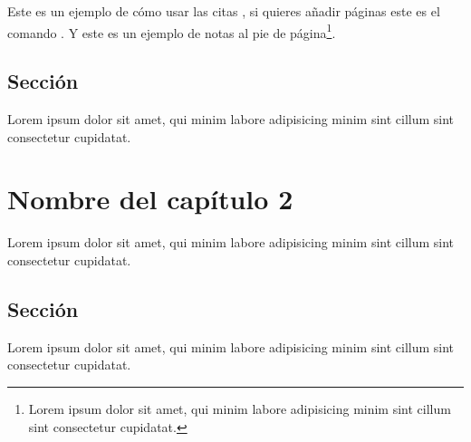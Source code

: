 \documentclass[letterpaper,12pt]{book} %
\begin{document}
Este es un ejemplo de cómo usar las citas
\parencite{Sartlp}, si quieres añadir páginas este
es el comando \parencite[50-60]{parmh}. Y este es
un ejemplo de notas al pie de
página\footnote{Lorem ipsum dolor sit amet, qui
minim labore adipisicing minim sint cillum sint
consectetur cupidatat.}.


\section{Sección}

Lorem ipsum dolor sit amet, qui minim labore adipisicing minim sint cillum sint consectetur cupidatat.


    \clearpage
\thispagestyle{empty}

    \chapter{Nombre del capítulo 2}
\thispagestyle{empty}
\pagestyle{empty}

\cleardoublepage

\pagestyle{headings}

Lorem ipsum dolor sit amet, qui minim labore adipisicing minim sint cillum sint consectetur cupidatat.

\section{Sección}

Lorem ipsum dolor sit amet, qui minim labore adipisicing minim sint cillum sint consectetur cupidatat.


    \clearpage
\thispagestyle{empty}
\cleardoublepage

\pagestyle{headings}


    \cleardoublepage{}
    
    \nocite{*} %
    \printbibliography %
\end{document}
